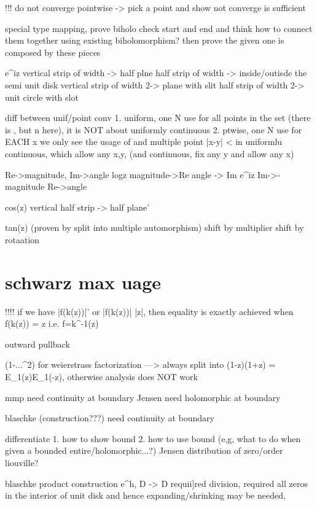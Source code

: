 {{!!! do not  converge pointwise -> pick a point and show not converge is sufficient


special type mapping, prove biholo
check start and end and think how to connect them together using existing biholomorphism? 
then prove the given one is composed by these pieces

e^{iz} vertical strip of width \pi -> half plne
		half strip of width \pi -> inside/outisde the semi unit disk
		vertical strip of width 2\pi -> plane with slit
		half strip of width 2\pi -> unit circle with slot

diff between unif/point conv 
	1. uniform, one N use for all points in the set (there is \epsilon, but n \delta here), it is NOT about uniformly continuous
	2. ptwise, one N use for EACH x
we only see the usage of \delta and multiple point |x-y| < \delta in uniformlu continuous, which allow any x,y, (and continuous, fix any y and allow any x)

Re->magnitude, 
		Im->angle
logz	magnitude->Re
		angle -> Im
e^{iz}	Im->-magnitude
		Re->angle

cos(z) vertical half strip -> half plane'

tan(z) 
(proven by split into multiple automorphism)
shift by multiplier
shift by rotaation

\section*{schwarz max uage}
!!!! if we have |f(k(z))|'  or |f(k(z))| \leq |z|, then equality is exactly achieved when f(k(z)) = z i.e. f=k^{-1}(z)

		outward 	pullback


(1-...^2) for weierstrass factorization ---> always split into (1-z)(1+z) = E_1(z)E_1(-z), otherwise analysis does NOT work


mmp need continuity at boundary
Jensen need holomorphic at boundary



blaschke (construction???) need continuity at boundary


differentiate
1. how to show bound
2. how to use bound (e,g, what to do when given a bounded entire/holomorphic...?)
	Jensen
	distribution of zero/order
	liouville?



blaschke product
	construction e^h, \partial D -> \partial D requii]red
	division, required all zeros in the interior of unit disk and hence expanding/shrinking may be needed, 
	
}}
